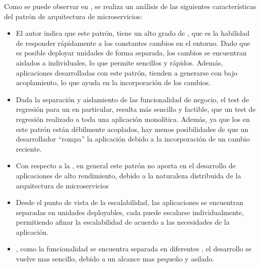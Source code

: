 Como se puede observar en \cite[p.~34]{richards2015}, se realiza un análisis de las siguientes características del patrón de arquitectura de microservicios:

\begin{itemize}

  \item El autor indica que este patrón, tiene un alto grado de , que es la habilidad de responder rápidamente a los constantes cambios en el entorno.  Dado que es posible deployar unidades de forma separada, los cambios se encuentran aislados a  individuales, lo que permite  sencillos y rápidos.
  Además, aplicaciones desarrolladas con este patrón, tienden a generarse con bajo acoplamiento, lo que ayuda en la incorporación de los cambios.

  \item {}
  Dada la separación y aislamiento de las funcionalidad de negocio, el test de regresión para un  en particular, resulta más sencillo y factible, que un test de regresión realizado a toda una aplicación monolítica.  Además, ya que los  en este patrón están débilmente acoplados, hay menos posibilidades de que un desarrollador ``rompa'' la aplicación debido a la incorporación de un cambio reciente.

  \item Con respecto a la , en general este patrón no aporta en el desarrollo de aplicaciones de alto rendimiento, debido a la naturaleza distribuida de la arquitectura de microservicios

  \item Desde el punto de vista de la escalabilidad, las aplicaciones se encuentran separadas en unidades deployables, cada  puede escalarse individualmente, permitiendo afinar la escalabilidad de acuerdo a las necesidades de la aplicación.

  \item {}, como la funcionalidad se encuentra separada en diferentes , el desarrollo se vuelve mas sencillo, debido a un alcance mas pequeño y asilado.

\end{itemize}
